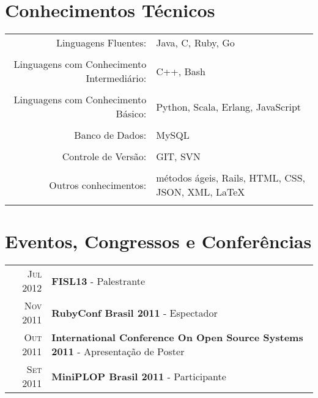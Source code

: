 \documentclass[a4paper,10pt]{article} %
\begin{document}

\section{Conhecimentos Técnicos}

\begin{tabular}{rp{11cm}}
Linguagens Fluentes: & Java, C, Ruby, Go\\
    \multicolumn{2}{c}{} \\

Linguagens com Conhecimento Intermediário: & C++, Bash\\
    \multicolumn{2}{c}{} \\

Linguagens com Conhecimento Básico: & Python, Scala, Erlang, JavaScript\\
    \multicolumn{2}{c}{} \\

Banco de Dados: & MySQL\\
    \multicolumn{2}{c}{} \\

Controle de Versão: & GIT, SVN\\
    \multicolumn{2}{c}{} \\

Outros conhecimentos: & métodos ágeis, Rails, HTML, CSS, JSON, XML, \LaTeX\\
    \multicolumn{2}{c}{} \\

\end{tabular}


\section{Eventos, Congressos e Conferências}

\begin{tabular}{rl}
\textsc{Jul} 2012 & \textbf{FISL13} - Palestrante\\

\textsc{Nov} 2011 & \textbf{RubyConf Brasil 2011} - Espectador\\
\textsc{Out} 2011 & \textbf{International Conference On Open Source Systems 2011} - Apresentação de Poster\\
\textsc{Set} 2011 & \textbf{MiniPLOP Brasil 2011} - Participante

\end{tabular}
\end{document}
